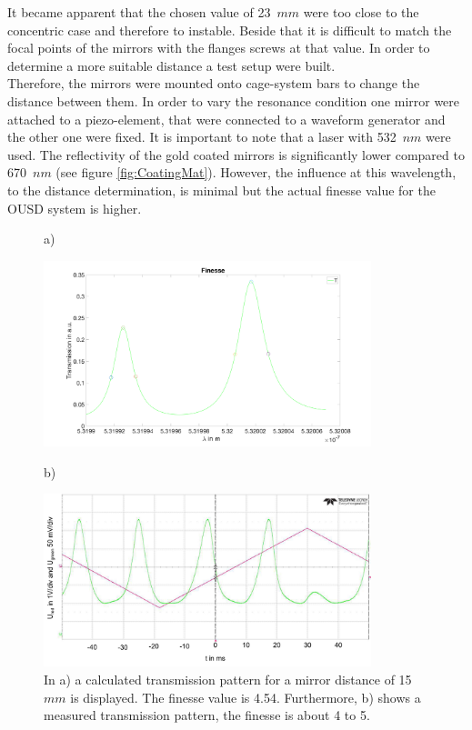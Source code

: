It became apparent that the chosen value of 23~$mm$ were too close to the concentric case and therefore to instable. Beside that it is difficult to match the focal points of the mirrors with the flanges screws at that value. In order to determine a more suitable distance a test setup were built.\\
Therefore, the mirrors were mounted onto cage-system bars to change the distance between them. In order to vary the resonance condition one mirror were attached to a piezo-element, that were connected to a waveform generator and the other one were fixed. It is important to note that a laser with 532~$nm$ were used. The reflectivity of the gold coated mirrors is significantly lower compared to 670~$nm$ (see figure \ref{fig:CoatingMat}). However, the influence at this wavelength, to the distance determination, is minimal but the actual finesse value for the OUSD system is higher. \\

\begin{figure}[H]
	a)
	\begin{minipage}{\textwidth}
		\begin{center}		
		\includegraphics[width = 0.85\textwidth, height=0.3\textheight]{06_ex-results_of_OUSD/images/finesse532.png}
		\end{center}
	\end{minipage}
	b)
	\begin{minipage}{\textwidth}
		\vspace*{0.5cm}
		\begin{center}		
		\includegraphics[width = 0.85\textwidth, height=0.3\textheight]{06_ex-results_of_OUSD/images/measFinesse.jpg}
	\end{center}
	\end{minipage}
\caption{In a) a calculated transmission pattern for a mirror distance of 15~$mm$ is displayed. The finesse value is 4.54. Furthermore, b) shows a measured transmission pattern, the finesse is about 4 to 5.}
\label{fig:finesse}
\end{figure}

